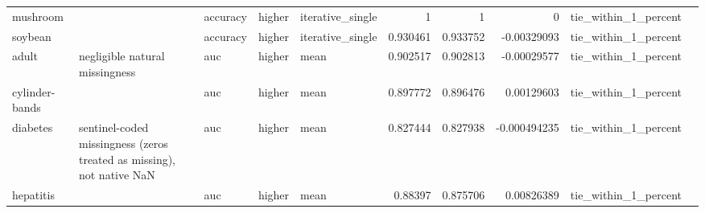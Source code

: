 \begin{table}[ht]
{\begin{tabular}{lllllrrrll}
 mushroom       &                                                                       & accuracy                       & higher             & iterative\_single &                   1        &               1        &                     0           & tie\_within\_1\_percent &                                                                                                                    \\
 soybean        &                                                                       & accuracy                       & higher             & iterative\_single &                   0.930461 &               0.933752 &                    -0.00329093  & tie\_within\_1\_percent &                                                                                                                    \\
 adult          & negligible natural missingness                                        & auc                            & higher             & mean             &                   0.902517 &               0.902813 &                    -0.00029577  & tie\_within\_1\_percent &                                                                                                                    \\
 cylinder-bands &                                                                       & auc                            & higher             & mean             &                   0.897772 &               0.896476 &                     0.00129603  & tie\_within\_1\_percent &                                                                                                                    \\
 diabetes       & sentinel-coded missingness (zeros treated as missing), not native NaN & auc                            & higher             & mean             &                   0.827444 &               0.827938 &                    -0.000494235 & tie\_within\_1\_percent &                                                                                                                    \\
 hepatitis      &                                                                       & auc                            & higher             & mean             &                   0.88397  &               0.875706 &                     0.00826389  & tie\_within\_1\_percent &                                                                                                                    \\

\end{tabular}}
\end{table}

